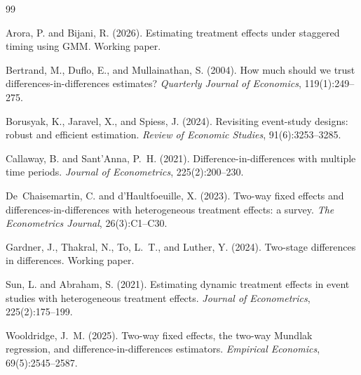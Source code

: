 \documentclass[12pt]{article}
\begin{document}
\begin{thebibliography}{99}

Arora, P. and Bijani, R. (2026).
\newblock Estimating treatment effects under staggered timing using {GMM}.
\newblock Working paper.

Bertrand, M., Duflo, E., and Mullainathan, S. (2004).
\newblock How much should we trust differences-in-differences estimates?
\newblock \textit{Quarterly Journal of Economics}, 119(1):249--275.

Borusyak, K., Jaravel, X., and Spiess, J. (2024).
\newblock Revisiting event-study designs: robust and efficient estimation.
\newblock \textit{Review of Economic Studies}, 91(6):3253--3285.

Callaway, B. and Sant'Anna, P.~H. (2021).
\newblock Difference-in-differences with multiple time periods.
\newblock \textit{Journal of Econometrics}, 225(2):200--230.

De~Chaisemartin, C. and d'Haultfoeuille, X. (2023).
\newblock Two-way fixed effects and differences-in-differences with
  heterogeneous treatment effects: a survey.
\newblock \textit{The Econometrics Journal}, 26(3):C1--C30.

Gardner, J., Thakral, N., To, L.~T., and Luther, Y. (2024).
\newblock Two-stage differences in differences.
\newblock Working paper.

Sun, L. and Abraham, S. (2021).
\newblock Estimating dynamic treatment effects in event studies with
  heterogeneous treatment effects.
\newblock \textit{Journal of Econometrics}, 225(2):175--199.

Wooldridge, J.~M. (2025).
\newblock Two-way fixed effects, the two-way {Mundlak} regression, and
  difference-in-differences estimators.
\newblock \textit{Empirical Economics}, 69(5):2545--2587.

\end{thebibliography}
\end{document}
